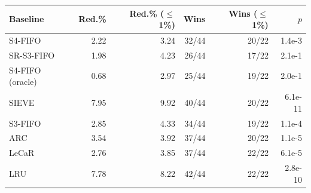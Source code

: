 \begin{tabular}{lrrrrr}
\toprule
Baseline & Red.\% & Red.\% ($\le$1\%) & Wins & Wins ($\le$1\%) & $p$ \\
\midrule
S4-FIFO~\cite{s4fifo} & 2.22 & 3.24 & 32/44 & 20/22 & 1.4e-3 \\
SR-S3-FIFO~\cite{srgadgets} & 1.98 & 4.23 & 26/44 & 17/22 & 2.1e-1 \\
S4-FIFO (oracle) & 0.68 & 2.97 & 25/44 & 19/22 & 2.0e-1 \\
SIEVE~\cite{sieve} & 7.95 & 9.92 & 40/44 & 20/22 & 6.1e-11 \\
S3-FIFO~\cite{s3fifo} & 2.85 & 4.33 & 34/44 & 19/22 & 1.1e-4 \\
ARC~\cite{arc} & 3.54 & 3.92 & 37/44 & 20/22 & 1.1e-5 \\
LeCaR~\cite{lecar} & 2.76 & 3.85 & 37/44 & 22/22 & 6.1e-5 \\
LRU & 7.78 & 8.22 & 42/44 & 22/22 & 2.8e-10 \\
\bottomrule
\end{tabular}
